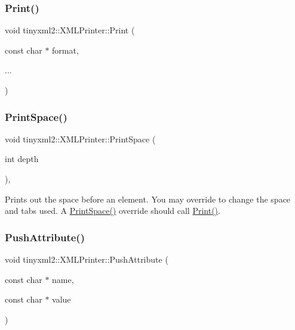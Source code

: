 \subsubsection{\texorpdfstring{Print()}{Print()}}
{\footnotesize\ttfamily void tinyxml2\+::\+X\+M\+L\+Printer\+::\+Print (\begin{DoxyParamCaption}\item[{const char $\ast$}]{format,  }\item[{}]{... }\end{DoxyParamCaption})\hspace{0.3cm}{\ttfamily [protected]}}

\mbox{\label{classtinyxml2_1_1_x_m_l_printer_a1c4b2ccbe4fdb316d54f5a93f3559260}} 
\subsubsection{\texorpdfstring{Print\+Space()}{PrintSpace()}}
{\footnotesize\ttfamily void tinyxml2\+::\+X\+M\+L\+Printer\+::\+Print\+Space (\begin{DoxyParamCaption}\item[{int}]{depth }\end{DoxyParamCaption})\hspace{0.3cm}{\ttfamily [protected]}, {\ttfamily [virtual]}}

Prints out the space before an element. You may override to change the space and tabs used. A \mbox{\hyperlink{classtinyxml2_1_1_x_m_l_printer_a1c4b2ccbe4fdb316d54f5a93f3559260}{Print\+Space()}} override should call \mbox{\hyperlink{classtinyxml2_1_1_x_m_l_printer_ab30210a7f32e45634e7a45137bf6fdf6}{Print()}}. \mbox{\label{classtinyxml2_1_1_x_m_l_printer_a9a4e2c9348b42e147629d5a99f4af3f0}} 
\subsubsection{\texorpdfstring{Push\+Attribute()}{PushAttribute()}\hspace{0.1cm}{\footnotesize\ttfamily [1/6]}}
{\footnotesize\ttfamily void tinyxml2\+::\+X\+M\+L\+Printer\+::\+Push\+Attribute (\begin{DoxyParamCaption}\item[{const char $\ast$}]{name,  }\item[{const char $\ast$}]{value }\end{DoxyParamCaption})}



